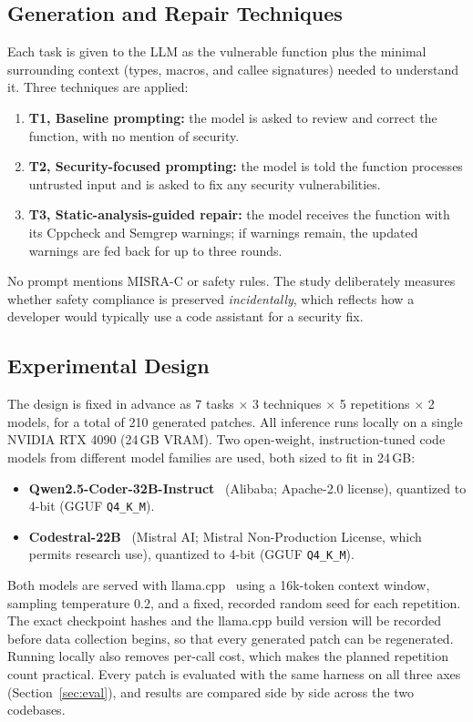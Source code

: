 \documentclass[12pt]{article}
\begin{document}
\subsection{Generation and Repair Techniques}
Each task is given to the LLM as the vulnerable function plus the minimal surrounding context (types, macros, and callee signatures) needed to understand it. Three techniques are applied:
\begin{enumerate}
    \item \textbf{T1, Baseline prompting:} the model is asked to review and correct the function, with no mention of security.
    \item \textbf{T2, Security-focused prompting:} the model is told the function processes untrusted input and is asked to fix any security vulnerabilities.
    \item \textbf{T3, Static-analysis-guided repair:} the model receives the function with its Cppcheck and Semgrep warnings; if warnings remain, the updated warnings are fed back for up to three rounds.
\end{enumerate}
No prompt mentions MISRA-C or safety rules. The study deliberately measures whether safety compliance is preserved \emph{incidentally}, which reflects how a developer would typically use a code assistant for a security fix.

\subsection{Experimental Design}
\label{sec:design}
The design is fixed in advance as 7 tasks $\times$ 3 techniques $\times$ 5 repetitions $\times$ 2 models, for a total of 210 generated patches. All inference runs locally on a single NVIDIA RTX 4090 (24\,GB VRAM). Two open-weight, instruction-tuned code models from different model families are used, both sized to fit in 24\,GB:
\begin{itemize}
    \item \textbf{Qwen2.5-Coder-32B-Instruct}~\citep{qwen25coder} (Alibaba; Apache-2.0 license), quantized to 4-bit (GGUF \texttt{Q4\_K\_M}).
    \item \textbf{Codestral-22B}~\citep{codestral} (Mistral AI; Mistral Non-Production License, which permits research use), quantized to 4-bit (GGUF \texttt{Q4\_K\_M}).
\end{itemize}
Both models are served with llama.cpp~\citep{llamacpp} using a 16k-token context window, sampling temperature 0.2, and a fixed, recorded random seed for each repetition. The exact checkpoint hashes and the llama.cpp build version will be recorded before data collection begins, so that every generated patch can be regenerated. Running locally also removes per-call cost, which makes the planned repetition count practical. Every patch is evaluated with the same harness on all three axes (Section~\ref{sec:eval}), and results are compared side by side across the two codebases.
\end{document}
